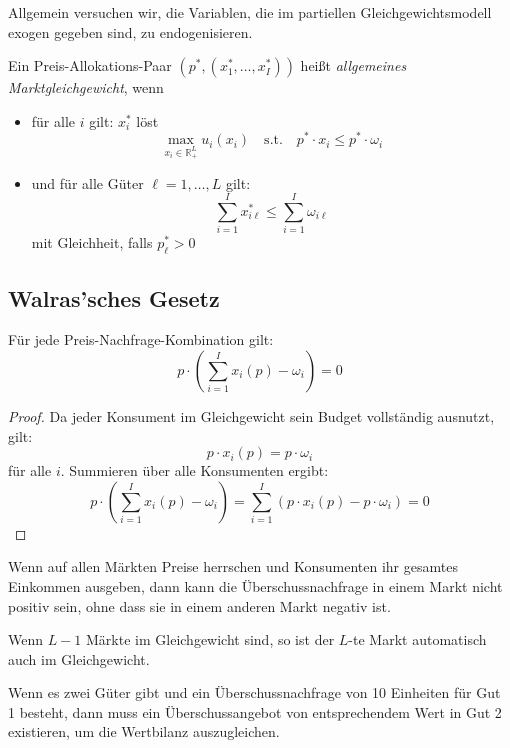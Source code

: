 Allgemein versuchen wir, die Variablen, die im partiellen Gleichgewichtsmodell exogen gegeben sind,
zu endogenisieren.


\begin{definition}
Ein Preis-Allokations-Paar \( (p^*, (x_1^*, \dots, x_I^*)) \) heißt \emph{allgemeines Marktgleichgewicht}, wenn
\begin{itemize}
    \item für alle \( i \) gilt: \( x_i^* \) löst
    \[
    \max_{x_i \in \mathbb{R}^L_+} u_i(x_i) \quad \text{s.t.} \quad p^* \cdot x_i \leq p^* \cdot \omega_i
    \]
    \item und für alle Güter \( \ell = 1, \dots, L \) gilt:
    \[
    \sum_{i=1}^I x_{i\ell}^* \leq \sum_{i=1}^I \omega_{i\ell}
    \]
    mit Gleichheit, falls \( p^*_\ell > 0 \)
\end{itemize}
\end{definition}

\subsection{Walras'sches Gesetz}

\begin{proposition}
Für jede Preis-Nachfrage-Kombination gilt:
\[
p \cdot \left( \sum_{i=1}^I x_i(p) - \omega_i \right) = 0
\]
\end{proposition}

\begin{proof}
Da jeder Konsument im Gleichgewicht sein Budget vollständig ausnutzt, gilt:
\[
p \cdot x_i(p) = p \cdot \omega_i
\]
für alle \( i \).  
Summieren über alle Konsumenten ergibt:
\[
p \cdot \left( \sum_{i=1}^I x_i(p) - \omega_i \right) = \sum_{i=1}^I \left(p \cdot x_i(p) - p \cdot \omega_i\right) = 0
\]
\end{proof}
Wenn auf allen Märkten Preise herrschen und Konsumenten ihr gesamtes Einkommen ausgeben, dann kann die Überschussnachfrage in einem Markt nicht positiv sein, ohne dass sie in einem anderen Markt negativ ist.

\begin{remark}
Wenn $L-1$ Märkte im Gleichgewicht sind, so ist der $L$-te Markt automatisch auch im Gleichgewicht.  
\end{remark}

\begin{example}
Wenn es zwei Güter gibt und ein Überschussnachfrage von 10 Einheiten für Gut 1 besteht, dann muss ein Überschussangebot von entsprechendem Wert in Gut 2 existieren, um die Wertbilanz auszugleichen.
\end{example}

